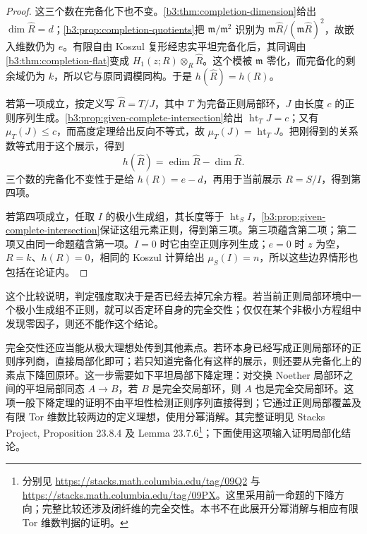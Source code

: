 \begin{proof}
	这三个数在完备化下也不变。\cref{b3:thm:completion-dimension}给出 \(\dim\widehat R=d\)；\cref{b3:prop:completion-quotients}把 \(\mathfrak m/\mathfrak m^2\) 识别为 \(\mathfrak m\widehat R/(\mathfrak m\widehat R)^2\)，故嵌入维数仍为 \(e\)。有限自由 Koszul 复形经忠实平坦完备化后，其同调由\cref{b3:thm:completion-flat}变成 \(H_1(z;R)\otimes_R\widehat R\)。这个模被 \(\mathfrak m\) 零化，而完备化的剩余域仍为 \(k\)，所以它与原同调模同构。于是 \(h(\widehat R)=h(R)\)。

	若第一项成立，按定义写 \(\widehat R=T/J\)，其中 \(T\) 为完备正则局部环，\(J\) 由长度 \(c\) 的正则序列生成。\cref{b3:prop:given-complete-intersection}给出 \(\operatorname{ht}_TJ=c\)；又有 \(\mu_T(J)\le c\)，而高度定理给出反向不等式，故 \(\mu_T(J)=\operatorname{ht}_TJ\)。把刚得到的关系数等式用于这个展示，得到
	\[
		h(\widehat R)=\operatorname{edim}\widehat R-\dim\widehat R.
	\]
	三个数的完备化不变性于是给 \(h(R)=e-d\)，再用于当前展示 \(R=S/I\)，得到第四项。

	若第四项成立，任取 \(I\) 的极小生成组，其长度等于 \(\operatorname{ht}_SI\)，\cref{b3:prop:given-complete-intersection}保证这组元素正则，得到第三项。第三项蕴含第二项；第二项又由同一命题蕴含第一项。\(I=0\) 时它由空正则序列生成；\(e=0\) 时 \(z\) 为空，\(R=k\)、\(h(R)=0\)，相同的 Koszul 计算给出 \(\mu_S(I)=n\)，所以这些边界情形也包括在论证内。
\end{proof}

这个比较说明，判定强度取决于是否已经去掉冗余方程。若当前正则局部环境中一个极小生成组不正则，就可以否定环自身的完全交性；仅仅在某个非极小方程组中发现零因子，则还不能作这个结论。

完全交性还应当能从极大理想处传到其他素点。若环本身已经写成正则局部环的正则序列商，直接局部化即可；若只知道完备化有这样的展示，则还要从完备化上的素点下降回原环。这一步需要如下平坦局部下降定理：对交换 Noether 局部环之间的平坦局部同态 \(A\to B\)，若 \(B\) 是完全交局部环，则 \(A\) 也是完全交局部环。这项一般下降定理的证明不由平坦性检测正则序列直接得到；它通过正则局部覆盖及有限 Tor 维数比较两边的定义理想，使用分幂消解。其完整证明见 Stacks Project, Proposition 23.8.4 及 Lemma 23.7.6\footnote{分别见 \url{https://stacks.math.columbia.edu/tag/09Q2} 与 \url{https://stacks.math.columbia.edu/tag/09PX}。这里采用前一命题的下降方向；完整比较还涉及闭纤维的完全交性。本书不在此展开分幂消解与相应有限 Tor 维数判据的证明。}；下面使用这项输入证明局部化结论。

